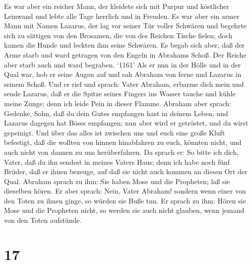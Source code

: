  Es war aber ein reicher Mann, der kleidete sich mit Purpur
und köstlicher Leinwand und lebte alle Tage herrlich und in Freuden.
 Es war aber ein armer Mann mit Namen Lazarus, der lag vor
seiner Tür voller Schwären  und begehrte sich zu sättigen
von den Brosamen, die von des Reichen Tische fielen; doch kamen die
Hunde und leckten ihm seine Schwären.  Es begab sich aber,
daß der Arme starb und ward getragen von den Engeln in Abrahams Schoß.
Der Reiche aber starb auch und ward begraben.  `1161' Als
er nun in der Hölle und in der Qual war, hob er seine Augen auf und sah
Abraham von ferne und Lazarus in seinem Schoß.  Und er rief
und sprach: Vater Abraham, erbarme dich mein und sende Lazarus, daß er
die Spitze seines Fingers ins Wasser tauche und kühle meine Zunge; denn
ich leide Pein in dieser Flamme.  Abraham aber sprach:
Gedenke, Sohn, daß du dein Gutes empfangen hast in deinem Leben, und
Lazarus dagegen hat Böses empfangen; nun aber wird er getröstet, und du
wirst gepeinigt.  Und über das alles ist zwischen uns und
euch eine große Kluft befestigt, daß die wollten von hinnen hinabfahren
zu euch, könnten nicht, und auch nicht von dannen zu uns herüberfahren.
 Da sprach er: So bitte ich dich, Vater, daß du ihn sendest
in meines Vaters Haus;  denn ich habe noch fünf Brüder, daß
er ihnen bezeuge, auf daß sie nicht auch kommen an diesen Ort der Qual.
 Abraham sprach zu ihm: Sie haben Mose und die Propheten;
laß sie dieselben hören.  Er aber sprach: Nein, Vater
Abraham! sondern wenn einer von den Toten zu ihnen ginge, so würden sie
Buße tun.  Er sprach zu ihm: Hören sie Mose und die
Propheten nicht, so werden sie auch nicht glauben, wenn jemand von den
Toten aufstünde.

\hypertarget{section-16}{%
\section{17}\label{section-16}}

